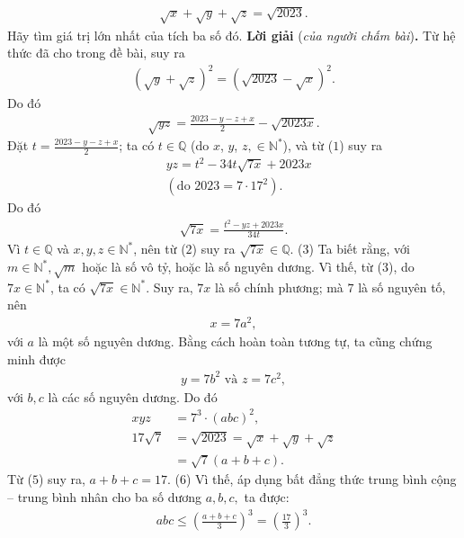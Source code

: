 \begin{multicols}{2}
\begin{align*}
		\sqrt x+\sqrt y+\sqrt z=\sqrt{2023}.
	\end{align*}
	Hãy tìm giá trị lớn nhất của tích ba số đó.
	\vskip 0.05cm
	\textbf{\color{thachthuctoanhoc}Lời giải} (\textit{của người chấm bài})\textbf{\color{thachthuctoanhoc}.}
	\vskip 0.05cm
	Từ hệ thức đã cho trong đề bài, suy ra
	\begin{align*}
		{\left( {\sqrt y  + \sqrt z } \right)^2} = {\left( {\sqrt {2023}  - \sqrt x } \right)^2}.
	\end{align*}
	Do đó
	\begin{align*}
		\sqrt {yz}  = \frac{{2023 - y - z + x}}{2} - \sqrt {2023x}. \tag{$1$}
	\end{align*}
	Đặt $t = \frac{{2023 - y - z + x}}{2}$; ta có $t \in \mathbb{Q}$  (do  $x$, $y$, $z, \in \mathbb{N^*}$), và từ ($1$) suy ra
	\begin{align*}
		&yz = t^2 - 34t\sqrt{7x} + 2023x \\
		&(\text{do } 2023 = 7 \cdot 17^2).
	\end{align*}
	Do đó
	\begin{align*}
		\sqrt {7x}  = \frac{{{t^2} - yz + 2023x}}{{34t}}. \tag{$2$}
	\end{align*}
	Vì $t \in \mathbb{Q}$ và  $x,y,z \in \mathbb{N^*}$, nên từ ($2$) suy ra $\sqrt{7x} \in \mathbb{Q}$. \hfill ($3$)
	\vskip 0.05cm
	Ta biết rằng, với $m \in \mathbb{N^*}, \sqrt{m}$ hoặc là số vô tỷ, hoặc là số nguyên dương. Vì thế, từ ($3$), do  $7x \in \mathbb{N^*}$, ta có $\sqrt{7x} \in \mathbb{N^*}$. Suy ra, $7x$ là số chính phương; mà $7$ là số nguyên tố, nên
	\begin{align*}
		 x = 7a^2,
	\end{align*}
	với $a$ là một số nguyên dương.
	\vskip 0.05cm
	Bằng cách hoàn toàn tương tự, ta cũng chứng minh được
	\begin{align*}
		y = 7b^2 \text{ và } z = 7c^2,
	\end{align*} 
	với $b, c$ là các số nguyên dương.
	\vskip 0.05cm
	Do đó
	\begin{align*}
		xyz &= 7^3 \cdot(abc)^2, \tag{$4$}\\
		17\sqrt 7  &= \sqrt {2023}  = \sqrt x  + \sqrt y  + \sqrt z  \\
		&= \sqrt 7 \left( {a + b + c} \right). \tag{$5$}
	\end{align*}
	Từ ($5$) suy ra, $a + b + c = 17$. \hfill ($6$)
	\vskip 0.05cm
	Vì thế, áp dụng bất đẳng thức trung bình cộng -- trung bình nhân cho ba số dương $a, b, c,$ ta được:
	\begin{align*}
		abc \le {\left( {\frac{{a + b + c}}{3}} \right)^3} = {\left( {\frac{{17}}{3}} \right)^3}.

\end{align*}
\end{multicols}
